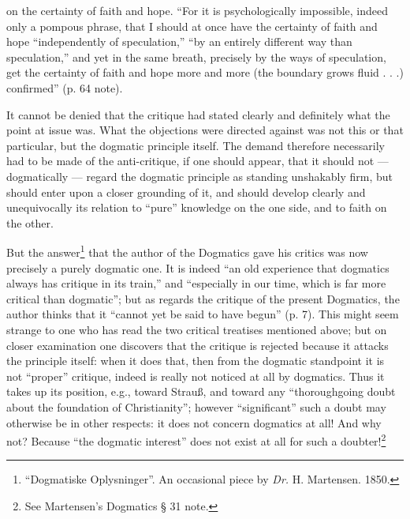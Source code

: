 \documentclass[12pt,a4paper]{book}
\newcommand{\opage}[1]{\marginnote{\footnotesize\textit{[#1]}}}
\begin{document}
\opage{30}\setcounter{footnote}{0}%
on the certainty of faith and hope. ``For it is psychologically
impossible, indeed only a pompous phrase, that I should at once
have the certainty of faith and hope ``independently of speculation,''
``by an entirely different way than speculation,'' and yet in the
same breath, precisely by the ways of speculation, get the certainty
of faith and hope more and more (the boundary grows fluid . . .)
confirmed'' (p. 64 note).

It cannot be denied that the critique had stated clearly and
definitely what the point at issue was. What the objections
were directed against was not this or that particular, but
the dogmatic principle itself. The demand therefore necessarily
had to be made of the anti-critique, if one should appear, that
it should not --- dogmatically --- regard the dogmatic principle as
standing unshakably firm, but should enter upon a closer
grounding of it, and should develop clearly and unequivocally its
relation to ``pure'' knowledge on the one side, and to faith
on the other.

But the answer\footnote{``Dogmatiske Oplysninger''. An occasional piece by \textit{Dr.} H. Martensen. 1850.} that the author of the Dogmatics gave his
critics was now precisely a purely dogmatic one. It is indeed ``an
old experience that dogmatics always has critique in its
train,'' and ``especially in our time, which is far more critical than
dogmatic''; but as regards the critique of the present Dogmatics,
the author thinks that it ``cannot yet be said to
have begun'' (p. 7). This might seem strange to one
who has read the two critical treatises mentioned above; but
on closer examination one discovers that the critique is rejected
because it attacks the principle itself: when it does that, then
from the dogmatic standpoint it is not ``proper'' critique, indeed
is really not noticed at all by dogmatics. Thus it
takes up its position, e.g., toward Strauß, and toward
any ``thoroughgoing doubt about the foundation of Christianity''; however
\opage{31}\setcounter{footnote}{0}%
``significant'' such a doubt may otherwise be in other respects:
it does not concern dogmatics at all! And why not?
Because ``the dogmatic interest'' does not exist at all for such
a doubter!\footnote{See Martensen's Dogmatics § 31 note.}
\end{document}
